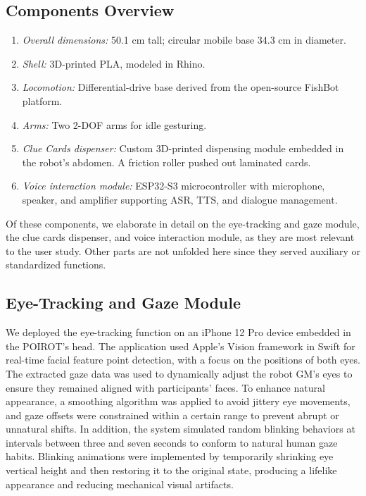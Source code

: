 \documentclass[sigconf,screen]{acmart-tagged}
\begin{document}
\subsection{Components Overview}
\begin{enumerate}
    \item \textit{Overall dimensions:} 50.1 cm tall; circular mobile base 34.3 cm in diameter.
    \item \textit{Shell:} 3D-printed PLA, modeled in Rhino.
    \item \textit{Locomotion:} Differential-drive base derived from the open-source FishBot platform.
    \item \textit{Arms:} Two 2-DOF arms for idle gesturing.
    \item \textit{Clue Cards dispenser:} Custom 3D-printed dispensing module embedded in the robot's abdomen. A friction roller pushed out laminated cards.
    \item \textit{Voice interaction module:} ESP32-S3 microcontroller with microphone, speaker, and amplifier supporting ASR, TTS, and dialogue management.
\end{enumerate}
Of these components, we elaborate in detail on the eye-tracking and gaze module, the clue cards dispenser, and voice interaction module, as they are most relevant to the user study. Other parts are not unfolded here since they served auxiliary or standardized functions.

\subsection{Eye-Tracking and Gaze Module}
\label{app:gaze}
We deployed the eye-tracking function on an iPhone 12 Pro device embedded in the POIROT’s head. The application used Apple’s Vision framework in Swift for real-time facial feature point detection, with a focus on the positions of both eyes. The extracted gaze data was used to dynamically adjust the robot GM’s eyes to ensure they remained aligned with participants’ faces. To enhance natural appearance, a smoothing algorithm was applied to avoid jittery eye movements, and gaze offsets were constrained within a certain range to prevent abrupt or unnatural shifts. In addition, the system simulated random blinking behaviors at intervals between three and seven seconds to conform to natural human gaze habits. Blinking animations were implemented by temporarily shrinking eye vertical height and then restoring it to the original state, producing a lifelike appearance and reducing mechanical visual artifacts. 
\end{document}
